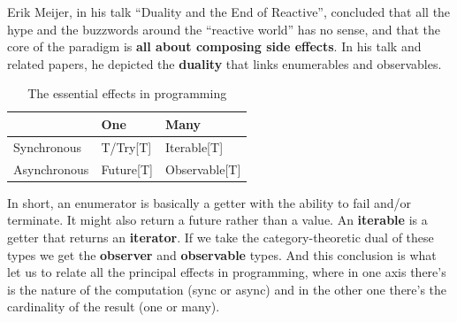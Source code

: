 Erik Meijer, in his talk ``Duality and the End of Reactive'', concluded
that all the hype and the buzzwords around the ``reactive world'' has no
sense, and that the core of the paradigm is \textbf{all about composing
side effects}. In his talk and related papers, he depicted the
\textbf{duality} that links enumerables and observables.

\begin{table}[]
\centering
\caption{The essential effects in programming}
\label{my-label}
\begin{tabular}{|l|l|l|}
\hline
             & {\bf One}     & {\bf Many}        \\ \hline
Synchronous  & T/Try{[}T{]}  & Iterable{[}T{]}   \\ \hline
Asynchronous & Future{[}T{]} & Observable{[}T{]} \\ \hline
\end{tabular}
\end{table}

In short, an enumerator is basically a getter with the ability to fail
and/or terminate. It might also return a future rather than a value. An
\textbf{iterable} is a getter that returns an \textbf{iterator}. If we
take the category-theoretic dual of these types we get the
\textbf{observer} and \textbf{observable} types. And this conclusion is
what let us to relate all the principal effects in programming, where in
one axis there's is the nature of the computation (sync or async) and in
the other one there's the cardinality of the result (one or many).
